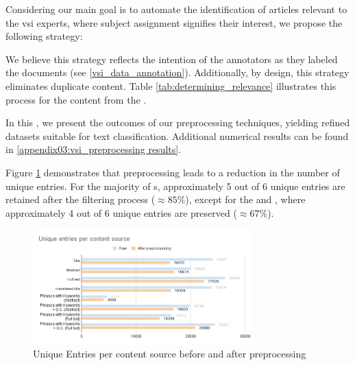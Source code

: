 Considering our main goal is to automate the identification of articles relevant to the \gls{vsi} experts, where subject assignment signifies their interest, we propose the following strategy:


We believe this strategy reflects the intention of the annotators as they labeled the documents (see \headerName{} \ref{vsi_data_annotation}). Additionally, by design, this strategy eliminates duplicate content. Table \ref{tab:determining_relevance} illustrates this process for the content from the \trafilaturaTitle{}.




\clearpage
{}
\label{vsi_results_of_preprocessing}

In this \headerName{}, we present the outcomes of our preprocessing techniques, yielding refined datasets suitable for text classification. Additional numerical results can be found in \appendixname{} \ref{appendix03:vsi_preprocessing results}.

Figure \ref{fig:05_unique_entries_after_preprocessing} demonstrates that preprocessing leads to a reduction in the number of unique entries. For the majority of \contentType{}s, approximately 5 out of 6 unique entries are retained after the filtering process ($\approx 85\%$), except for the \trafilaturaTitle{} and \trafilaturaAbstract{}, where approximately 4 out of 6 unique entries are preserved ($\approx 67\%$).


\begin{figure}
    \centering
    \includegraphics[width=0.75\textwidth]{Figures/05/Preprocessing_Unique entries per content source.png}
    \caption{Unique Entries per content source before and after preprocessing}
    \label{fig:05_unique_entries_after_preprocessing}
\end{figure}

